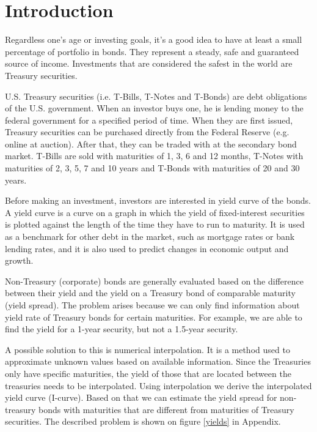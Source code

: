 \documentclass[a4paper,10pt]{article}
\begin{document}
\section{Introduction}
Regardless one's age or investing goals, it's a good idea to have at least a small percentage of portfolio in bonds. They represent a steady, safe and guaranteed source of income. Investments that are considered the safest in the world are Treasury securities.

U.S. Treasury securities (i.e. T-Bills, T-Notes and T-Bonds) are debt obligations of the U.S. government.
When an investor buys one, he is lending money to the federal government for a specified period of time.
When they are first issued, Treasury securities can be purchased directly from the Federal Reserve (e.g. online at auction).
After that, they can be traded with at the secondary bond market. 
T-Bills are sold with maturities of 1, 3, 6 and 12 months, T-Notes with maturities of 2, 3, 5, 7 and 10 years and T-Bonds with maturities of 20 and 30 years. \cite{treas}

Before making an investment, investors are interested in yield curve of the bonds.
A yield curve is a curve on a graph in which the yield of fixed-interest securities is plotted against the length of the time they have to run to maturity.
It is used as a benchmark for other debt in the market, such as mortgage rates or bank lending rates, and it is also used to predict changes in economic output and growth. \cite{compact}

Non-Treasury (corporate) bonds are generally evaluated based on the difference between their yield and the yield on a Treasury bond of comparable maturity (yield spread).
The problem arises because we can only find information about yield rate of Treasury bonds for
certain maturities. For example, we are able to find the yield for a 1-year security, but not a 1.5-year security. \cite{hagan}

A possible solution to this is numerical interpolation. It is a method used to approximate unknown values based on available information.
Since the Treasuries only have specific maturities, the yield of those that are located between the treasuries needs to be interpolated.
Using interpolation we derive the interpolated yield curve (I-curve). Based on that we can estimate the yield spread for non-treasury bonds with maturities that are different from maturities of Treasury securities.
The described problem is shown on figure \ref{yields} in Appendix. \cite{icurve}
\end{document}
